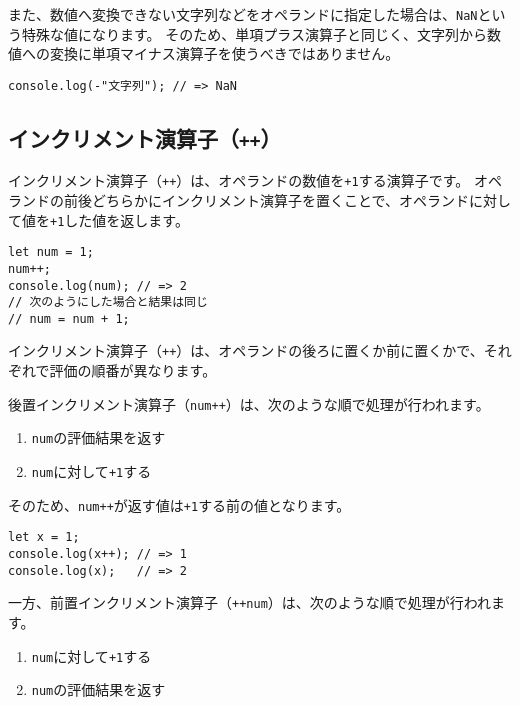 また、数値へ変換できない文字列などをオペランドに指定した場合は、\texttt{NaN}という特殊な値になります。
そのため、単項プラス演算子と同じく、文字列から数値への変換に単項マイナス演算子を使うべきではありません。

\begin{lstlisting}
console.log(-"文字列"); // => NaN
\end{lstlisting}

\hypertarget{increment-operator}{%
\subsection{\texorpdfstring{インクリメント演算子（\texttt{++}）}{インクリメント演算子（++）}}\label{increment-operator}}

インクリメント演算子（\texttt{++}）は、オペランドの数値を\texttt{+1}する演算子です。
オペランドの前後どちらかにインクリメント演算子を置くことで、オペランドに対して値を\texttt{+1}した値を返します。

\begin{lstlisting}
let num = 1;
num++;
console.log(num); // => 2
// 次のようにした場合と結果は同じ
// num = num + 1;
\end{lstlisting}

インクリメント演算子（\texttt{++}）は、オペランドの後ろに置くか前に置くかで、それぞれで評価の順番が異なります。

後置インクリメント演算子（\texttt{num++}）は、次のような順で処理が行われます。

\begin{enumerate}
\def\labelenumi{\arabic{enumi}.}
\item
  \texttt{num}の評価結果を返す
\item
  \texttt{num}に対して\texttt{+1}する
\end{enumerate}

そのため、\texttt{num++}が返す値は\texttt{+1}する前の値となります。

\begin{lstlisting}
let x = 1;
console.log(x++); // => 1
console.log(x);   // => 2
\end{lstlisting}

一方、前置インクリメント演算子（\texttt{++num}）は、次のような順で処理が行われます。

\begin{enumerate}
\def\labelenumi{\arabic{enumi}.}
\item
  \texttt{num}に対して\texttt{+1}する
\item
  \texttt{num}の評価結果を返す
\end{enumerate}

